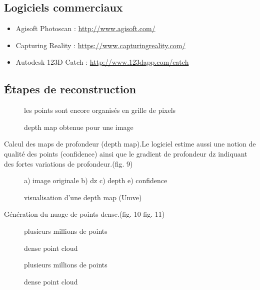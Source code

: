 \documentclass[a4paper,10pt,french]{sphinxhowto}
\begin{document}
\subsection{\textbf{Logiciels commerciaux}}
\label{mvs:logiciels-commerciaux}\begin{itemize}
\item {} 
Agisoft Photoscan : \href{http://www.agisoft.com/}{http://www.agisoft.com/}

\item {} 
Capturing Reality : \href{https://www.capturingreality.com/}{https://www.capturingreality.com/}

\item {} 
Autodesk 123D Catch : \href{http://www.123dapp.com/catch}{http://www.123dapp.com/catch}

\end{itemize}


\subsection{\textbf{Étapes de reconstruction}}
\label{mvs:etapes-de-reconstruction}\begin{figure}[htbp]
\centering
\capstart

\caption{depth map obtenue pour une image}{\small 
les points sont encore organisés en grille de pixels
}\end{figure}

Calcul des maps de profondeur (depth map).Le logiciel estime aussi une notion de qualité des points (confidence) ainsi que le gradient de profondeur dz indiquant des fortes variations de profondeur.(fig. 9)
\begin{figure}[htbp]
\centering
\capstart

\caption{visualisation d'une depth map (Umve)}{\small 
a) image originale b) dz
c) depth           e) confidence
}\end{figure}

Génération du nuage de points dense.(fig. 10 fig. 11)
\begin{figure}[htbp]
\centering
\capstart

\caption{dense point cloud}{\small 
plusieurs millions de points
}\end{figure}
\begin{figure}[htbp]
\centering
\capstart

\caption{dense point cloud}{\small 
plusieurs millions de points
}\end{figure}
\end{document}
